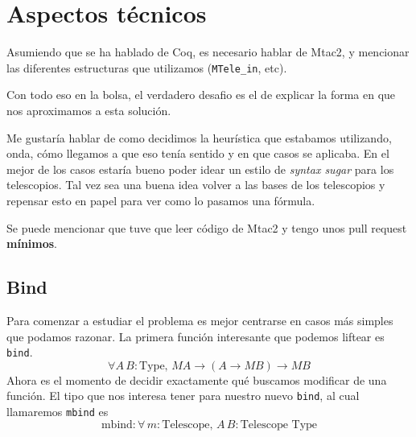 \section{Aspectos técnicos}

Asumiendo que se ha hablado de Coq, es necesario hablar de Mtac2, y mencionar
las diferentes estructuras que utilizamos (\texttt{MTele_in}, etc).

Con todo eso en la bolsa, el verdadero desafio es el de explicar la forma en que
nos aproximamos a esta solución.


Me gustaría hablar de como decidimos la heurística que estabamos utilizando,
onda, cómo llegamos a que eso tenía sentido y en que casos se aplicaba.
En el mejor de los casos estaría bueno poder idear un estilo de \textit{syntax
  sugar} para los telescopios.
Tal vez sea una buena idea volver a las bases de los telescopios y repensar esto
en papel para ver como lo pasamos una fórmula.

Se puede mencionar que tuve que leer código de Mtac2 y tengo unos pull request
\textbf{mínimos}.

\subsection{Bind}


Para comenzar a estudiar el problema es mejor centrarse en casos más simples que
podamos razonar. La primera función interesante que podemos liftear es
\texttt{bind}.
$$ \forall A\, B : \text{Type}, \, M A \rightarrow (A \rightarrow M B)
\rightarrow M B $$
Ahora es el momento de decidir exactamente qué buscamos modificar de una
función. El tipo que nos interesa tener para nuestro nuevo
\texttt{bind}, al cual llamaremos \texttt{mbind} es
$$\text{mbind} : \forall \, m : \text{Telescope},\, A\, B : \text{Telescope Type}$$
